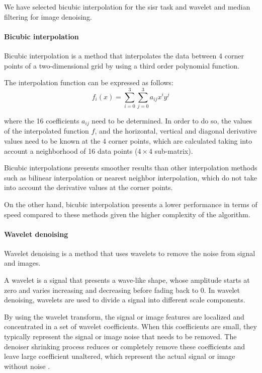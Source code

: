 We have selected bicubic interpolation for the \gls{sisr} task and wavelet and median filtering for image denoising.

\paragraph{Bicubic interpolation}
Bicubic interpolation is a method that interpolates the data between 4 corner points of a two-dimensional grid by using a third order polynomial function.

The interpolation function can be expressed as follows:
$$f_i(x) = \sum_{i=0}^{3}\sum_{j=0}^3 a_{ij}x^iy^j$$

where the 16 coefficients $a_{ij}$ need to be determined. In order to do so, the values of the interpolated function $f$, and the horizontal, vertical and diagonal derivative values need to be known at the 4 corner points, which are calculated taking into account a neighborhood of 16 data points ($4\times 4$ sub-matrix).

Bicubic interpolations presents smoother results than other interpolation methods such as bilinear interpolation or nearest neighbor interpolation, which do not take into account the derivative values at the corner points.

On the other hand, bicubic interpolation presents a lower performance in terms of speed compared to these methods given the higher complexity of the algorithm.

\paragraph{Wavelet denoising}
Wavelet denoising is a method that uses wavelets to remove the noise from signal and images.

A wavelet is a signal that presents a wave-like shape, whose amplitude starts at zero and varies increasing and decreasing before fading back to 0. In wavelet denoising, wavelets are used to divide a signal into different scale components. 

By using the wavelet transform, the signal or image features are localized and concentrated in a set of wavelet coefficients. When this coefficients are small, they typically represent the signal or image noise that needs to be removed. The denoiser shrinking process reduces or completely remove these coefficients and leave large coefficient unaltered, which represent the actual signal or image without noise \cite{WAVELET}.


